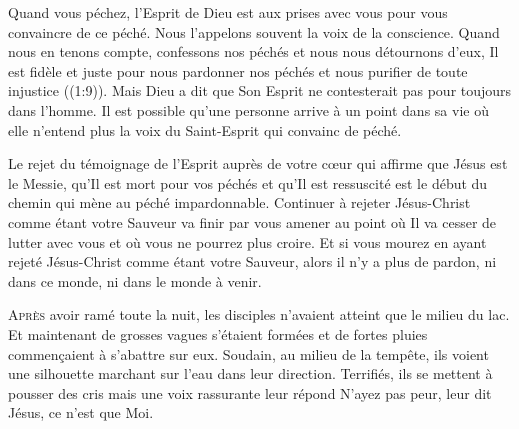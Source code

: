 
Quand vous péchez, l'Esprit de Dieu est aux prises avec vous pour
 vous convaincre de ce péché. Nous l'appelons souvent la voix
 de la conscience. Quand nous en tenons compte, confessons nos péchés
 et nous nous détournons d'eux, \Og Il est fidèle et juste
 pour nous pardonner nos péchés et nous purifier de toute injustice \Fg{}
 ((1:9)).
 Mais Dieu a dit que Son Esprit ne contesterait pas pour toujours
 dans l'homme. Il est possible qu'une personne arrive à un point
 dans sa vie où elle n'entend plus la voix du Saint-Esprit 
 qui convainc de péché. 

Le rejet du témoignage de l'Esprit auprès de votre c\oe{}ur
 \ocadr qui affirme que Jésus est le Messie, qu'Il est mort pour vos péchés
 et qu'Il est ressuscité \fcadr{}
 est le début du chemin qui mène au péché impardonnable.
 Continuer à rejeter Jésus-Christ comme étant votre Sauveur
 va finir par vous amener au point où Il va cesser de lutter avec vous
 et où vous ne pourrez plus croire. Et si vous mourez 
 en ayant rejeté Jésus-Christ comme étant votre Sauveur,
 alors il n'y a plus de pardon, 
 ni dans ce monde, ni dans le monde à venir. 

\dvrule






\lettrine{A}{près} avoir ramé toute la nuit,
 les disciples n'avaient atteint que le milieu du lac.
 Et maintenant de grosses vagues s'étaient formées et de fortes pluies
 commen\c{c}aient à s'abattre sur eux. Soudain, au milieu de la tempête,
 ils voient une silhouette marchant sur l'eau dans leur direction.
 Terrifiés, ils se mettent à pousser des cris
 \ocadr {}
 mais une voix rassurante leur répond\frcolon{}
 \Og N'ayez pas peur, leur dit Jésus, ce n'est que Moi. \Fg{}

